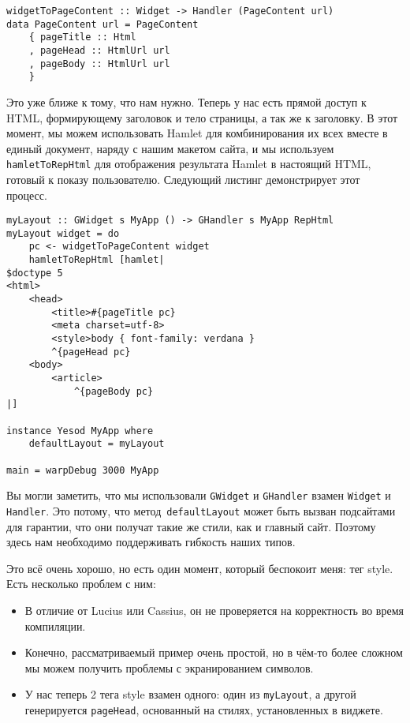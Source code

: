 \begin{lstlisting}
widgetToPageContent :: Widget -> Handler (PageContent url)
data PageContent url = PageContent
    { pageTitle :: Html
    , pageHead :: HtmlUrl url
    , pageBody :: HtmlUrl url
    }
\end{lstlisting}

Это уже ближе к тому, что нам нужно. Теперь у нас есть прямой доступ к HTML, формирующему заголовок и тело страницы, а так же к заголовку. В этот момент, мы можем использовать Hamlet для комбинирования их всех вместе в единый документ, наряду с нашим макетом сайта, и мы используем \lstinline'hamletToRepHtml' для отображения результата Hamlet в настоящий HTML, готовый к показу пользователю. Следующий листинг демонстрирует этот процесс.

\begin{lstlisting}[caption={Использование \lstinline'widgetToPageContent'}]
myLayout :: GWidget s MyApp () -> GHandler s MyApp RepHtml
myLayout widget = do
    pc <- widgetToPageContent widget
    hamletToRepHtml [hamlet|
$doctype 5
<html>
    <head>
        <title>#{pageTitle pc}
        <meta charset=utf-8>
        <style>body { font-family: verdana }
        ^{pageHead pc}
    <body>
        <article>
            ^{pageBody pc}
|]

instance Yesod MyApp where
    defaultLayout = myLayout

main = warpDebug 3000 MyApp
\end{lstlisting}
\begin{remark}
Вы могли заметить, что мы использовали \lstinline'GWidget' и \lstinline'GHandler' взамен \lstinline'Widget' и \lstinline'Handler'. Это потому, что метод~\lstinline'defaultLayout' может быть вызван подсайтами для гарантии, что они получат такие же стили, как и главный сайт. Поэтому здесь нам необходимо поддерживать гибкость наших типов.
\end{remark}

Это всё очень хорошо, но есть один момент, который беспокоит меня: тег style. Есть несколько проблем с ним:
\begin{itemize}
\item В отличие от Lucius или Cassius, он не проверяется на корректность во время компиляции.
\item Конечно, рассматриваемый пример очень простой, но в чём-то более сложном мы можем получить проблемы с экранированием символов.
\item У нас теперь 2 тега style взамен одного: один из \lstinline'myLayout', а другой генерируется \lstinline'pageHead', основанный на стилях, установленных в виджете.
\end{itemize}

